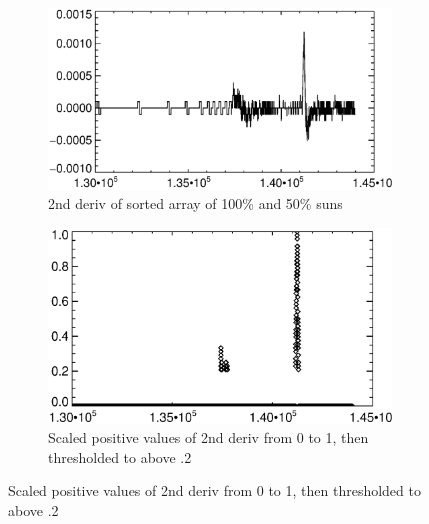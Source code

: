 \documentclass[10pt]{scrartcl}
\begin{document}
\begin{figure}[!h]
    \begin{center}
    \begin{subfigure}[b]{.49\textwidth}
        \centering
        \includegraphics[width=1.\textwidth]{../plots_tables_images/reg12.eps}
        \caption{2nd deriv of sorted array of 100\% and 50\% suns}
        \label{reg12peaks}
    \end{subfigure}
    \begin{subfigure}[b]{.49\textwidth}
        \centering
        \includegraphics[width=1.\textwidth]{../plots_tables_images/scaledreg12.eps}
        \caption{Scaled positive values of 2nd deriv from 0 to 1, then thresholded to above .2}
        \label{scaled12peaks}
    \end{subfigure}


\end{center}
\end{figure}
\end{document}
